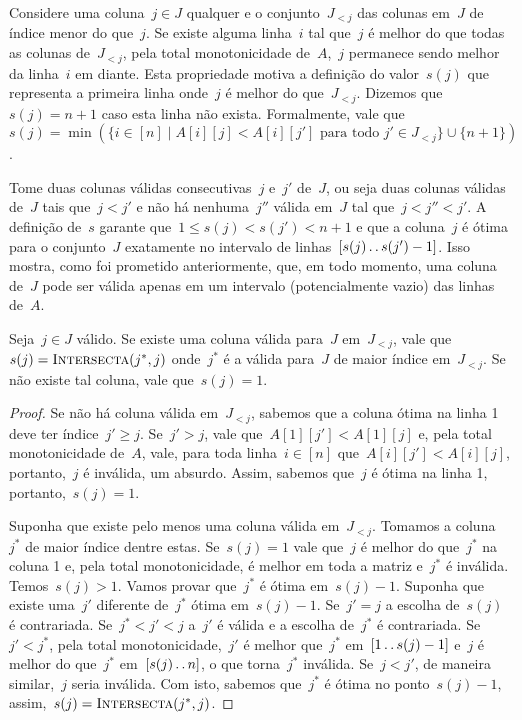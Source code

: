 Considere uma coluna~${ j \in J }$ qualquer e o conjunto~$J_{<j}$ das colunas em~$J$ de índice menor do que~$j$. Se existe alguma linha~$i$ tal que~$j$ é melhor do que todas as colunas de~$J_{<j}$, pela total monotonicidade de~$A$,~$j$ permanece sendo melhor da linha~$i$ em diante. Esta propriedade motiva a definição do valor~$s(j)$ que representa a primeira linha onde~$j$ é melhor do que~$J_{<j}$. Dizemos que~$s(j) = n+1$ caso esta linha não exista. Formalmente, vale que~${ s(j) = \min(\{i \in [n] \mid A[i][j] < A[i][j'] \text{ para todo } j' \in J_{<j} \} \cup \{ n+1 \}) }$.

Tome duas colunas válidas consecutivas~$j$ e~$j'$ de~$J$, ou seja duas colunas válidas de~$J$ tais que~$j < j'$ e não há nenhuma~$j''$ válida em~$J$ tal que~${ j < j'' < j' }$. A definição de~$s$ garante que~${ 1 \leq s(j) < s(j') < n + 1 }$ e que a coluna~$j$ é ótima para o conjunto~$J$ exatamente no intervalo de linhas~$[s(j) \,.\,.\, s(j') - 1]$. Isso mostra, como foi prometido anteriormente, que, em todo momento, uma coluna de~$J$ pode ser válida apenas em um intervalo (potencialmente vazio) das linhas de~$A$.

\begin{prop} \label{Online:convex:easys}
Seja~${ j \in J }$ válido. Se existe uma coluna válida para~$J$ em~${ J_{<j} }$, vale que~${ s(j) = \textsc{Intersecta}(j^*,j) }$ onde~$j^*$ é a válida para~$J$ de maior índice em~${ J_{<j} }$. Se não existe tal coluna, vale que~${ s(j) = 1 }$.
\end{prop}

\begin{proof}
Se não há coluna válida em~$J_{<j}$, sabemos que a coluna ótima na linha 1 deve ter índice~$j' \geq j$. Se~$j' > j$, vale que~${ A[1][j'] < A[1][j] }$ e, pela total monotonicidade de~$A$, vale, para toda linha~${ i \in [n] }$ que~${ A[i][j'] < A[i][j] }$, portanto,~$j$ é inválida, um absurdo. Assim, sabemos que~$j$ é ótima na linha 1, portanto,~${s(j) = 1}$.

Suponha que existe pelo menos uma coluna válida em~$J_{<j}$. Tomamos a coluna~$j^*$ de maior índice dentre estas. Se~${ s(j) = 1 }$ vale que~$j$ é melhor do que~$j^*$ na coluna 1 e, pela total monotonicidade, é melhor em toda a matriz e~$j^*$ é inválida. Temos~${ s(j) > 1 }$. Vamos provar que~$j^*$ é ótima em~${ s(j) - 1 }$. Suponha que existe uma~$j'$ diferente de~$j^*$ ótima em~$s(j) - 1$. Se~${ j' = j }$ a escolha de~$s(j)$ é contrariada. Se~${ j^* < j' < j }$ a~$j'$ é válida e a escolha de~$j^*$ é contrariada. Se~${ j' < j^* }$, pela total monotonicidade,~$j'$ é melhor que~$j^*$ em~$[1 \,.\,.\, s(j) - 1]$ e~$j$ é melhor do que~$j^*$ em~$[s(j) \,.\,.\, n]$, o que torna~$j^*$ inválida. Se~${ j < j' }$, de maneira similar,~$j$ seria inválida.  Com isto, sabemos que~$j^*$ é ótima no ponto~$s(j) - 1$, assim,~${s(j) = \textsc{Intersecta}(j^*,j)}$.
\end{proof}

